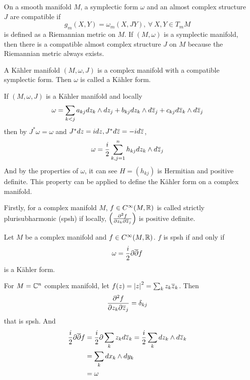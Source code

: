 \documentclass[a4paper,12pt]{article}
\begin{document}
	On a smooth manifold $M$, a symplectic form $\omega$ and an almost complex structure $J$ are compatible if 
	\begin{equation*}
		g_m(X,Y) = \omega_m(X,JY),~\forall~X,Y \in T_mM
	\end{equation*}
	is defined as a Riemannian metric on $M$. If $(M,\omega)$ is a symplectic manifold, then there is a compatible almost complex structure $J$ on $M$ because the Riemannian metric always exists. 
	\begin{defn}
		A K\"ahler manifold $(M,\omega,J)$ is a complex manifold with a compatible symplectic form. Then $\omega$ is called a K\"ahler form.
	\end{defn}
	If $(M,\omega,J)$ is a K\"ahler manifold and locally
	\begin{equation*}
		\omega = \sum_{k<j} a_{kj}dz_k\wedge dz_j + b_{kj}dz_k\wedge d\overline{z}_j + c_{kj}d\overline{z}_k\wedge d\overline{z}_j
	\end{equation*}
	then by $J^*\omega = \omega$ and $J^*dz = idz,J^*d\overline{z} = -id\overline{z}$,
	\begin{equation*}
		\omega = \frac{i}{2} \sum_{k,j=1}^n h_{kj} dz_k\wedge d\overline{z}_j
	\end{equation*}
	And by the properties of $\omega$, it can see $H=(h_{kj})$ is Hermitian and positive definite. This property can be applied to define the K\"ahler form on a complex manifold. 

	Firstly, for a complex manifold $M$, $f \in C^{\infty}(M,\mathbb{R})$ is called strictly plurisubharmonic (spsh) if locally, $\left(\frac{\partial^2 f}{\partial z_k \partial \overline{z}_j}\right)$ is positive definite.
	\begin{thm}
		Let $M$ be a complex manifold and $f \in C^{\infty}(M,\mathbb{R})$. $f$ is spsh if and only if 
		\begin{equation*}
			\omega = \frac{i}{2}\partial \overline{\partial} f
		\end{equation*}
		is a K\"ahler form.
	\end{thm}

	\begin{exam}
		For $M = \mathbb{C}^n$ complex manifold, let $f(z) = \left\lvert z\right\lvert^2 = \sum_k z_k\overline{z}_k$. Then
		\begin{equation*}
			\frac{\partial^2 f}{\partial z_k \partial \overline{z}_j} = \delta_{kj}
		\end{equation*}
		that is spsh. And
		\begin{equation*}
			\begin{split}
				\frac{i}{2}\partial \overline{\partial} f &= \frac{i}{2} \partial \sum_k z_kd\overline{z}_k = \frac{i}{2} \sum_k dz_k \wedge d\overline{z}_k \\
				&= \sum_k dx_k \wedge dy_k \\
				&= \omega
			\end{split}
		\end{equation*}
	\end{exam}
\end{document}

